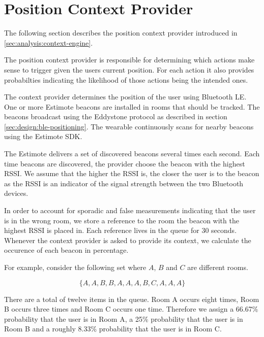 \section{Position Context Provider}
\label{sec:design:position-context-provider}

The following section describes the position context provider introduced in \cref{sec:analysis:context-engine}.

The position context provider is responsible for determining which actions make sense to trigger given the users current position. For each action it also provides probabilties indicating the likelihood of those actions being the intended ones.

The context provider determines the position of the user using Bluetooth LE. One or more Estimote beacons are installed in rooms that should be tracked. The beacons broadcast using the Eddystone protocol as described in section \ref{sec:design:ble-positioning}. The wearable continuously scans for nearby beacons using the Estimote SDK.

The Estimote delivers a set of discovered beacons several times each second. Each time beacons are discovered, the provider choose the beacon with the highest RSSI. We assume that the higher the RSSI is, the closer the user is to the beacon as the RSSI is an indicator of the signal strength between the two Bluetooth devices.

In order to account for sporadic and false measurements indicating that the user is in the wrong room, we store a reference to the room the beacon with the highest RSSI is placed in. Each reference lives in the queue for 30 seconds.  Whenever the context provider is asked to provide its context, we calculate the occurence of each beacon in percentage.

For example, consider the following set where $A$, $B$ and $C$ are different rooms.

\begin{equation*}
  \{ A, A, B, B, A, A, A, B, C, A, A, A \}
\end{equation*}

There are a total of twelve items in the queue. Room A occurs eight times, Room B occurs three times and Room C occurs one time. Therefore we assign a 66.67\% probability that the user is in Room A, a 25\% probability that the user is in Room B and a roughly 8.33\% probability that the user is in Room C.

